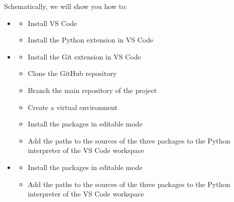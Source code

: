 \documentclass[letterpaper,10pt,english]{sphinxmanual}
\begin{document}
\sphinxAtStartPar
Schematically, we will show you how to:
\begin{itemize}
\item {} \begin{description}
\begin{itemize}
\item {} 
\sphinxAtStartPar
Install VS Code

\item {} 
\sphinxAtStartPar
Install the Python extension in VS Code

\end{itemize}

\end{description}

\item {} \begin{description}
\begin{itemize}
\item {} 
\sphinxAtStartPar
Install the Git extension in VS Code

\item {} 
\sphinxAtStartPar
Clone the GitHub repository

\item {} 
\sphinxAtStartPar
Branch the main repository of the project

\item {} 
\sphinxAtStartPar
Create a virtual environment

\item {} 
\sphinxAtStartPar
Install the packages in editable mode

\item {} 
\sphinxAtStartPar
Add the paths to the sources of the three packages to the Python interpreter of the VS Code workspace

\end{itemize}

\end{description}

\item {} \begin{description}
\begin{itemize}
\item {} 
\sphinxAtStartPar
Install the packages in editable mode

\item {} 
\sphinxAtStartPar
Add the paths to the sources of the three packages to the Python interpreter of the VS Code workspace

\end{itemize}

\end{description}

\end{itemize}
\end{document}
